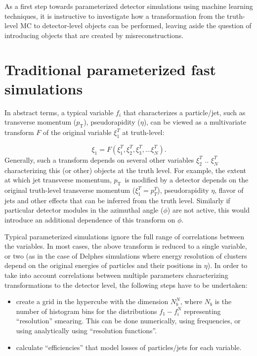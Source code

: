 \documentclass[showpacs,showkeys,preprint,prd,nofootinbib,linenumbers,12pt,superscriptaddress]{revtex4-1}
\def\pt{\ensuremath{p_{\mathrm{T}}}}
\begin{document}
As a first step towards parameterized detector simulations using machine learning techniques, it is instructive to investigate how a transformation from the truth-level MC to detector-level objects can be performed, leaving aside the question of introducing objects that are created by misreconstructions.

\section{Traditional parameterized fast simulations}

In abstract terms, a typical variable $f_i$ that characterizes a particle/jet, such as transverse momentum (\pt), pseudorapidity ($\eta$), can be viewed as a  multivariate transform $F$ of the original variable $\xi_1^T$ at truth-level:

$$
\xi_1 = F (\xi_1^T, \xi_2^T, \xi_3^T, ...\xi_N^T).
$$
Generally, such a transform  depends on several other variables $\xi_2^T$ ..  $\xi_N^T$ characterizing this (or other) objects at the truth level. For example, the extent at which jet transverse momentum, \pt\ is modified  by a detector depends on the original truth-level transverse momentum ($\xi_1^T=p_T^T$), pseudorapidity $\eta$,  flavor of jets and other effects that can be inferred from the truth level. Similarly if particular detector modules in the azimuthal angle ($\phi$) are not active, this would introduce an additional dependence of this transform on $\phi$.

Typical parameterized simulations ignore the full range of correlations between the variables. In most cases, the above transform is reduced to a single variable, or two (as in the case of Delphes simulations where energy resolution of clusters depend on the original energies of particles and their positions in $\eta$). In order to take into account correlations between  multiple parameters characterizing transformations to the detector level, the following steps have to be undertaken:

\begin{itemize}

\item
  create a grid in the hypercube with the dimension $N_b^N$, where $N_b$ is the number of histogram bins for the distributions $f_1-f_i^N$  representing ``resolution'' smearing. This can be done numerically, using frequencies, or using analytically using ``resolution functions''.

\item
  calculate ``efficiencies'' that model losses of particles/jets for each variable.

\end{itemize}
\end{document}
